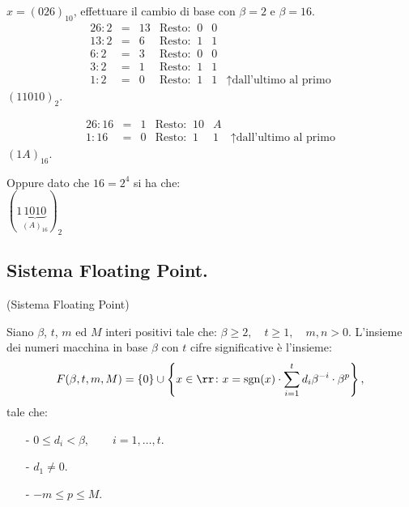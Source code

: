 \begin{ese}
$x = (026)_{10}$, effettuare il cambio di base con $\beta = 2$ e $\beta = 16$.
\[
\begin{array}{cccr|r|l}
26 : 2 & = & 13 & \textrm{Resto: }\ 0 & 0 &\\
13 : 2 & = & 6 & \textrm{Resto: }\ 1 & 1 &\\
6 : 2 & = & 3 & \textrm{Resto: }\ 0 & 0 & \\
3 : 2 & = & 1 & \textrm{Resto: }\ 1 & 1 &\\
1 : 2 & = & 0 & \textrm{Resto: }\ 1 & 1 & \uparrow \textrm{dall'ultimo al 
primo}
\end{array}
\]
$(11010)_2$.

\[
\begin{array}{cccr|r|l}
26 : 16 & = & 1 & \textrm{Resto: }\ 10 & A &\\
1 : 16 & = & 0 & \textrm{Resto: }\ 1 & 1 & \uparrow \textrm{dall'ultimo al 
primo}
\end{array}
\]
$(1A)_{16}$.
\begin{flushleft}
Oppure dato che $16 = 2^4$ si ha che:\\
$(1\underbrace{1010}_{(A)_{16}})_2$
\end{flushleft}
\end{ese}

\subsection{Sistema Floating Point.}

\begin{defi}(Sistema Floating Point)

Siano $\beta$, $t$, $m$ ed $M$ interi positivi tale che:
$\beta \geq 2, \quad t \geq 1, \quad m,n > 0.$ L'insieme dei numeri macchina
in base $\beta$ con $t$ cifre significative è l'insieme:
\[F(\beta, t, m, M) = \{0\} \cup \left\{x \in \rr \colon x = \textrm{sgn}(x)
\cdot \sum_{i = 1}^{t}d_i\beta^{-i}\cdot \beta^p\right\},\]
tale che:
\begin{itemize}
\item[-]$0 \leq d_i < \beta, \qquad i = 1, \ldots, t.$
\item[-]$d_1 \neq 0.$
\item[-]$-m \leq p \leq M$.
\end{itemize}
\end{defi}
